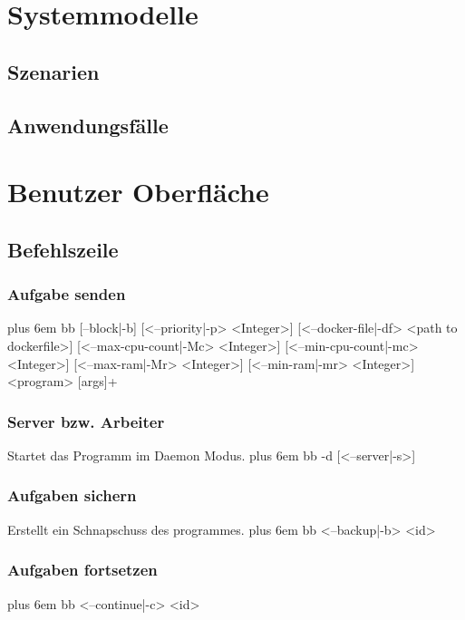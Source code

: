 \documentclass[a4paper,12pt]{article}
\makeatletter
\newenvironment{mycode}
 {\def\@xobeysp{\ }\verbatim\rightskip=0pt plus 6em\relax}
 {\endverbatim}
\makeatother
\begin{document}


\section{Systemmodelle}

\subsection{Szenarien}

\subsection{Anwendungsfälle}

\section{Benutzer Oberfläche}
\subsection{Befehlszeile}
\subsubsection{Aufgabe senden}
\begin{mycode}
bb [--block|-b] [<--priority|-p> <Integer>] [<--docker-file|-df> <path to dockerfile>] [<--max-cpu-count|-Mc> <Integer>] [<--min-cpu-count|-mc> <Integer>] [<--max-ram|-Mr> <Integer>] [<--min-ram|-mr> <Integer>] <program> [args]+
\end{mycode}

\subsubsection{Server bzw. Arbeiter}
Startet das Programm im \gls{Daemon} Modus.
\begin{mycode}
bb -d [<--server|-s>]
\end{mycode}

\subsubsection{Aufgaben sichern}
Erstellt ein Schnapschuss des programmes.
\begin{mycode}
bb <--backup|-b> <id>
\end{mycode}
\subsubsection{Aufgaben fortsetzen}
\begin{mycode}
bb <--continue|-c> <id>
\end{mycode}
\end{document}
